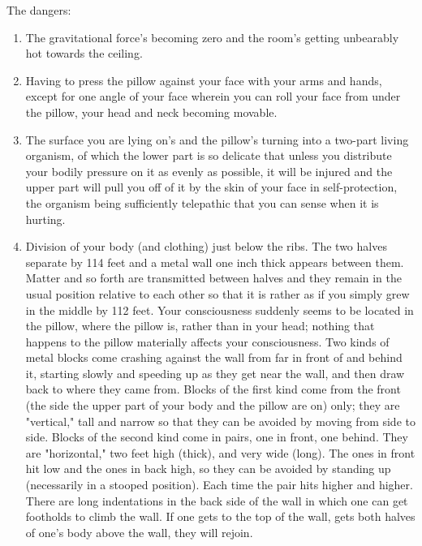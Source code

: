 The dangers: 
\begin{enumerate}
\item The gravitational force's becoming zero and the room's getting 
unbearably hot towards the ceiling. 
\item Having to press the pillow against your face with your arms and hands, 
except for one angle of your face wherein you can roll your face from under 
the pillow, your head and neck becoming movable. 
\item The surface you are lying on's and the pillow's turning into a two-part 
living organism, of which the lower part is so delicate that unless you 
distribute your bodily pressure on it as evenly as possible, it will be injured 
and the upper part will pull you off of it by the skin of your face in 
self-protection, the organism being sufficiently telepathic that you can 
sense when it is hurting. 
\item Division of your body (and clothing) just below the ribs. The two halves 
separate by 114 feet and a metal wall one inch thick appears between them. 
Matter and so forth are transmitted between halves and they remain in the 
usual position relative to each other so that it is rather as if you simply grew 
in the middle by 112 feet. Your consciousness suddenly seems to be located 
in the pillow, where the pillow is, rather than in your head; nothing that 
happens to the pillow materially affects your consciousness. Two kinds of 
metal blocks come crashing against the wall from far in front of and behind 
it, starting slowly and speeding up as they get near the wall, and then draw 
back to where they came from. Blocks of the first kind come from the front 
(the side the upper part of your body and the pillow are on) only; they are 
"vertical," tall and narrow so that they can be avoided by moving from side 
to side. Blocks of the second kind come in pairs, one in front, one behind. 
They are "horizontal," two feet high (thick), and very wide (long). The ones 
in front hit low and the ones in back high, so they can be avoided by standing 
up (necessarily in a stooped position). Each time the pair hits higher and 
higher. There are long indentations in the back side of the wall in which one 
can get footholds to climb the wall. If one gets to the top of the wall, gets 
both halves of one's body above the wall, they will rejoin. 
\end{enumerate}
